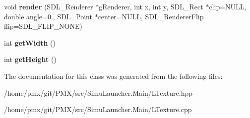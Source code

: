 \begin{DoxyCompactItemize}
\mbox{\label{classLTexture_ab98c7e0c0e6c4e2fe343315d47b155f5}} 
void {\bfseries render} (S\+D\+L\+\_\+\+Renderer $\ast$g\+Renderer, int x, int y, S\+D\+L\+\_\+\+Rect $\ast$clip=N\+U\+LL, double angle=0., S\+D\+L\+\_\+\+Point $\ast$center=N\+U\+LL, S\+D\+L\+\_\+\+Renderer\+Flip flip=S\+D\+L\+\_\+\+F\+L\+I\+P\+\_\+\+N\+O\+NE)
\item 
\mbox{\label{classLTexture_a542c1f81d98fd5659a04eb394d61a879}} 
int {\bfseries get\+Width} ()
\item 
\mbox{\label{classLTexture_a277f45af3dae7e35ca846a527039e59a}} 
int {\bfseries get\+Height} ()
\end{DoxyCompactItemize}


The documentation for this class was generated from the following files\+:\begin{DoxyCompactItemize}
\item 
/home/pmx/git/\+P\+M\+X/src/\+Simu\+Launcher.\+Main/L\+Texture.\+hpp\item 
/home/pmx/git/\+P\+M\+X/src/\+Simu\+Launcher.\+Main/L\+Texture.\+cpp\end{DoxyCompactItemize}
